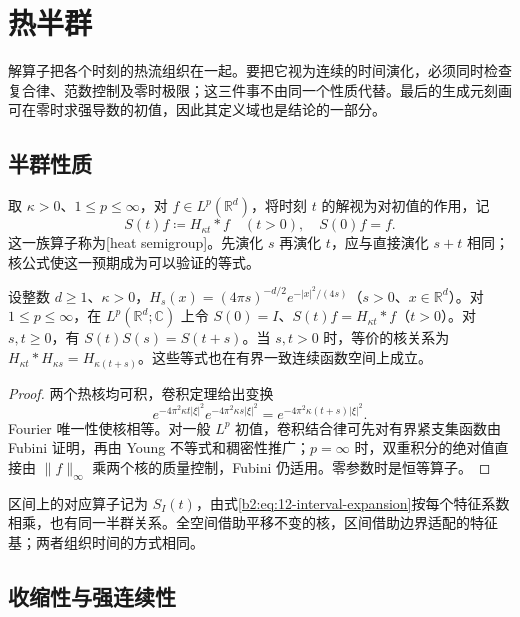 \section{热半群}
\label{b2:sec:1204}

解算子把各个时刻的热流组织在一起。要把它视为连续的时间演化，必须同时检查复合律、范数控制及零时极限；这三件事不由同一个性质代替。最后的生成元刻画可在零时求强导数的初值，因此其定义域也是结论的一部分。

\subsection{半群性质}
\label{b2:subsec:120401}

取 \(\kappa>0\)、\(1\le p\le\infty\)，对 \(f\in L^p(\mathbb R^d)\)，将时刻 \(t\) 的解视为对初值的作用，记
\[
 S(t)f\coloneqq H_{\kappa t}*f\quad(t>0),
 \quad S(0)f=f.
\]
这一族算子称为[heat semigroup]。先演化 \(s\) 再演化 \(t\)，应与直接演化 \(s+t\) 相同；核公式使这一预期成为可以验证的等式。

\begin{proposition}\label{b2:prop:12-semigroup}
设整数 \(d\geq1\)、\(\kappa>0\)，\(H_s(x)=(4\pi s)^{-d/2}e^{-|x|^2/(4s)}\)（\(s>0\)、\(x\in\mathbb R^d\)）。对 \(1\leq p\leq\infty\)，在 \(L^p(\mathbb R^d;\mathbb C)\) 上令 \(S(0)=I\)、\(S(t)f=H_{\kappa t}*f\)（\(t>0\)）。对 \(s,t\geq0\)，有 \(S(t)S(s)=S(t+s)\)。当 \(s,t>0\) 时，等价的核关系为 \(H_{\kappa t}*H_{\kappa s}=H_{\kappa(t+s)}\)。这些等式也在有界一致连续函数空间上成立。
\end{proposition}
\begin{proof}
两个热核均可积，卷积定理给出变换
\[
 e^{-4\pi^2\kappa t|\xi|^2}e^{-4\pi^2\kappa s|\xi|^2}
 =e^{-4\pi^2\kappa(t+s)|\xi|^2}.
\]
Fourier 唯一性使核相等。对一般 \(L^p\) 初值，卷积结合律可先对有界紧支集函数由 Fubini 证明，再由 Young 不等式和稠密性推广；\(p=\infty\) 时，双重积分的绝对值直接由 \(\|f\|_\infty\) 乘两个核的质量控制，Fubini 仍适用。零参数时是恒等算子。
\end{proof}

区间上的对应算子记为 \(S_I(t)\)，由式\eqref{b2:eq:12-interval-expansion}按每个特征系数相乘，也有同一半群关系。全空间借助平移不变的核，区间借助边界适配的特征基；两者组织时间的方式相同。

\subsection{收缩性与强连续性}
\label{b2:subsec:120402}


